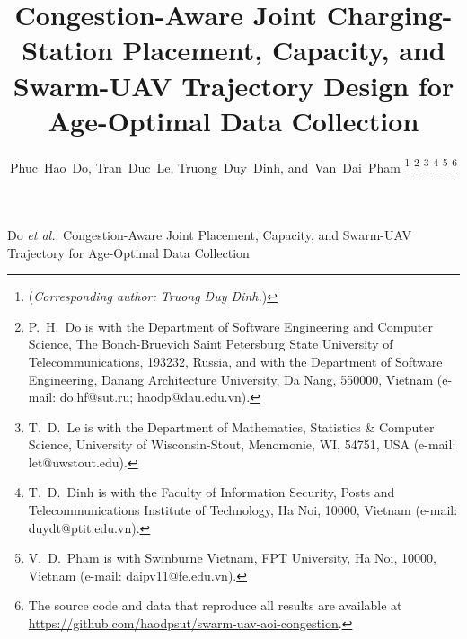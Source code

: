 \documentclass[journal]{IEEEtran}
\begin{document}
\title{Congestion-Aware Joint Charging-Station Placement, Capacity, and
Swarm-UAV Trajectory Design for Age-Optimal Data Collection}

\author{Phuc~Hao~Do,
Tran~Duc~Le,
Truong~Duy~Dinh,
and~Van~Dai~Pham%
\thanks{(\textit{Corresponding author: Truong Duy Dinh.})}%
\thanks{P.~H.~Do is with the Department of Software Engineering and Computer
Science, The Bonch-Bruevich Saint Petersburg State University of
Telecommunications, 193232, Russia, and with the Department of Software
Engineering, Danang Architecture University, Da Nang, 550000, Vietnam (e-mail:
do.hf@sut.ru; haodp@dau.edu.vn).}%
\thanks{T.~D.~Le is with the Department of Mathematics, Statistics \& Computer
Science, University of Wisconsin-Stout, Menomonie, WI, 54751, USA (e-mail:
let@uwstout.edu).}%
\thanks{T.~D.~Dinh is with the Faculty of Information Security, Posts and
Telecommunications Institute of Technology, Ha Noi, 10000, Vietnam (e-mail:
duydt@ptit.edu.vn).}%
\thanks{V.~D.~Pham is with Swinburne Vietnam, FPT University, Ha Noi, 10000,
Vietnam (e-mail: daipv11@fe.edu.vn).}%
\thanks{The source code and data that reproduce all results are available at
\url{https://github.com/haodpsut/swarm-uav-aoi-congestion}.}}

%
{Do \MakeLowercase{\textit{et al.}}: Congestion-Aware Joint Placement, Capacity, and Swarm-UAV Trajectory for Age-Optimal Data Collection}

\maketitle
\end{document}
